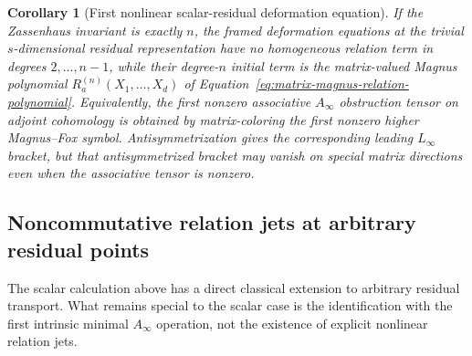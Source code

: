 \documentclass[11pt]{article}
\newtheorem{corollary}[theorem]{Corollary}
\theoremstyle{definition}
\begin{document}
\begin{corollary}[First nonlinear scalar-residual deformation equation]\label{cor:scalar-magnus-kuranishi}
If the Zassenhaus invariant is exactly $n$, the framed deformation equations
at the trivial $s$-dimensional residual representation have no homogeneous
relation term in degrees $2,\ldots,n-1$, while their degree-$n$ initial term
is the matrix-valued Magnus polynomial
$R_a^{(n)}(X_1,\ldots,X_d)$ of
Equation~\eqref{eq:matrix-magnus-relation-polynomial}.  Equivalently, the
first nonzero associative $A_\infty$ obstruction tensor on adjoint
cohomology is obtained by matrix-coloring the first nonzero higher
Magnus--Fox symbol.  Antisymmetrization gives the corresponding leading
$L_\infty$ bracket, but that antisymmetrized bracket may vanish on special
matrix directions even when the associative tensor is nonzero.
\end{corollary}


\subsection{Noncommutative relation jets at arbitrary residual points}\label{subsec:arbitrary-residual-word-jets}

The scalar calculation above has a direct classical extension to arbitrary
residual transport.  What remains special to the scalar case is the
identification with the first intrinsic minimal $A_\infty$ operation, not the
existence of explicit nonlinear relation jets.
\end{document}
